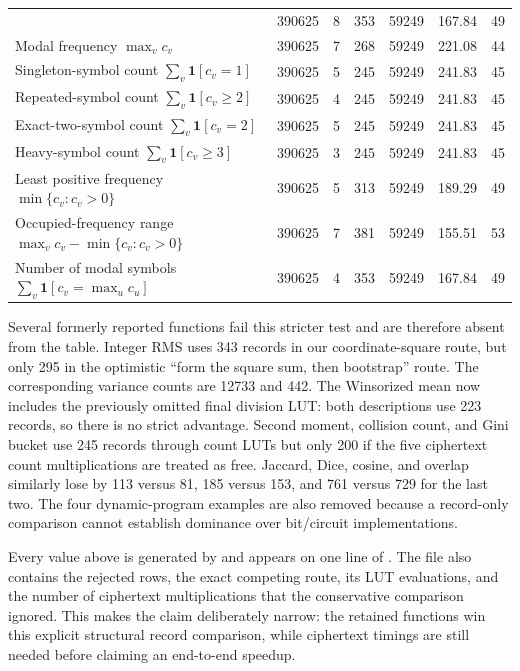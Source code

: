 \documentclass[10pt]{article}
\begin{document}
\begin{longtable}{@{}L{0.36\textwidth}rrrrrr@{}}
 &390625&8&353&59249&167.84&49\\
Modal frequency \(\max_v c_v\)
 &390625&7&268&59249&221.08&44\\
Singleton-symbol count \(\sum_v\mathbf1[c_v=1]\)
 &390625&5&245&59249&241.83&45\\
Repeated-symbol count \(\sum_v\mathbf1[c_v\ge2]\)
 &390625&4&245&59249&241.83&45\\
Exact-two-symbol count \(\sum_v\mathbf1[c_v=2]\)
 &390625&5&245&59249&241.83&45\\
Heavy-symbol count \(\sum_v\mathbf1[c_v\ge3]\)
 &390625&3&245&59249&241.83&45\\
Least positive frequency \(\min\{c_v:c_v>0\}\)
 &390625&5&313&59249&189.29&49\\
Occupied-frequency range
\(\max_v c_v-\min\{c_v:c_v>0\}\)
 &390625&7&381&59249&155.51&53\\
Number of modal symbols \(\sum_v\mathbf1[c_v=\max_u c_u]\)
 &390625&4&353&59249&167.84&49\\
\bottomrule
\end{longtable}

Several formerly reported functions fail this stricter test and are therefore
absent from the table.  Integer RMS uses 343 records in our coordinate-square
route, but only 295 in the optimistic ``form the square sum, then bootstrap''
route.  The corresponding variance counts are 12733 and 442.  The Winsorized
mean now includes the previously omitted final division LUT: both descriptions
use 223 records, so there is no strict advantage.  Second moment, collision
count, and Gini bucket use 245 records through count LUTs but only 200 if the
five ciphertext count multiplications are treated as free.  Jaccard, Dice,
cosine, and overlap similarly lose by 113 versus 81, 185 versus 153, and 761
versus 729 for the last two.  The four dynamic-program examples are also removed
because a record-only comparison cannot establish dominance over bit/circuit
implementations.

Every value above is generated by
 and appears on
one line of
.
The file also contains
the rejected rows, the exact competing route, its LUT evaluations, and the
number of ciphertext multiplications that the conservative comparison ignored.
This makes the claim deliberately narrow: the retained functions win this
explicit structural record comparison, while ciphertext timings are still
needed before claiming an end-to-end speedup.
\end{document}
